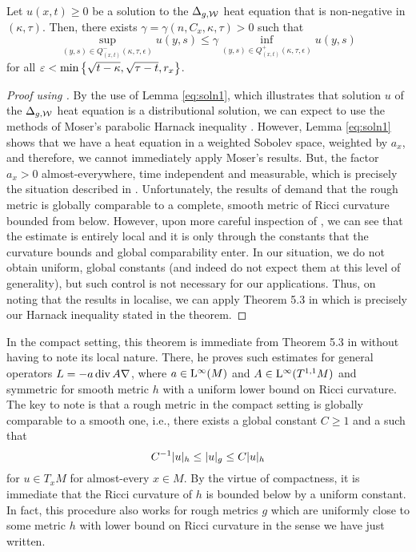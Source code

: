 \documentclass[a4paper, 12pt]{amsart}
\begin{document}
\begin{thm}
\label{thm:Harnack}
Let $u(x,t) \geq 0$ be a
solution to the $\Delta_{g,\mathcal{W}}$ heat equation 
that is non-negative in $(\kappa, \tau)$. 
Then, there exists $\gamma = \gamma(n, C_x, \kappa, \tau) > 0$ such that 
$$ \sup_{(y,s) \in Q^-_{(x,t)}(\kappa, \tau,\epsilon)} u(y, s) 
	\leq \gamma \inf_{(y,s) \in Q^+_{(x,t)}(\kappa,\tau,\epsilon)} u(y,s)$$
for all $\varepsilon < \min\left\{ \sqrt{t - \kappa}, \sqrt{\tau - t}, r_x\right\}$.
\end{thm}

\begin{proof}[Proof using \cite{SC}]
By the use of Lemma \ref{eq:soln1}, which illustrates that solution $u$ of the $\Delta_{g,\mathcal{W}}$ heat equation is a distributional solution, we can expect to use the methods of Moser's parabolic Harnack inequality \cite{MR0159139,MR0288405}. However, Lemma \ref{eq:soln1} shows that we have a heat equation in a weighted Sobolev space, weighted by $a_x$, and therefore, we cannot immediately apply Moser's results. But, the factor $a_x > 0$ almost-everywhere, time independent and measurable, which is precisely the situation described in \cite[Section 4]{SC}.  Unfortunately, the results of \cite{SC} demand that the rough metric is globally comparable to a complete, smooth metric of Ricci curvature bounded from below. However, upon more careful inspection of \cite{SC}, we can see that the estimate is entirely local and it is only through the constants that the curvature bounds and global comparability enter. In our situation, we do not obtain uniform, global constants (and indeed do not expect them at this level of generality), but such control is not necessary for our applications. Thus, on noting that the results in \cite{SC} localise, we can apply Theorem 5.3 in \cite{SC} which is precisely our Harnack inequality stated in the theorem.
\end{proof}

In the compact setting, this theorem 
is immediate from Theorem 5.3 in \cite{SC} without having to note
its local nature. There, 
he proves such estimates for general operators
$L = -a \operatorname{div} A \nabla$, where $a \in {\rm L}^{\infty}_{\rm {}}(M)$
and $A \in {\rm L}^{\infty}_{\rm {}}(T^{1,1}M)$ and symmetric
for smooth metric $h$ with a uniform lower bound
on Ricci curvature.
The key to note is that a rough metric in the 
compact setting is globally comparable to a smooth one, 
i.e., there exists a global constant $C \geq 1$ 
and a 
such that
$$ C^{-1} |u|_{h} \leq |u|_g \leq C |u|_{h}$$
for $u \in T_x M$ for almost-every $x \in M$.
By the virtue of compactness, it is immediate
that the Ricci curvature of $h$ is bounded below
by a uniform constant. 
In fact, this procedure also works 
for rough metrics $g$ which 
are uniformly close to some metric $h$ with 
lower bound on Ricci curvature in the sense
we have just written.
\end{document}
